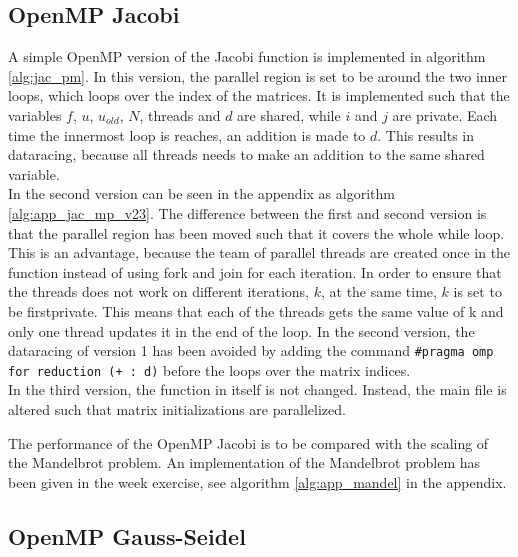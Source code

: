 



\subsection{OpenMP Jacobi}
A simple OpenMP version of the Jacobi function is implemented in algorithm \ref{alg:jac_pm}. In this version, the parallel region is set to be around the two inner loops, which loops over the index of the matrices. It is implemented such that the variables $f$, $u$, $u_{old}$, $N$, threads and $d$ are shared, while $i$ and $j$ are private. Each time the innermost loop is reaches, an addition is made to $d$. This results in dataracing, because all threads needs to make an addition to the same shared variable. \\ 
In the second version can be seen in the appendix as algorithm \ref{alg:app_jac_mp_v23}. The difference between the first and second version is that the parallel region has been moved such that it covers the whole while loop. This is an advantage, because the team of parallel threads are created once in the function instead of using fork and join for each iteration. In order to ensure that the threads does not work on different iterations, $k$, at the same time, $k$ is set to be firstprivate. This means that each of the threads gets the same value of k and only one thread updates it in the end of the loop. In the second version, the dataracing of version 1 has been avoided by adding the command \texttt{\#pragma omp for reduction (+ : d)} before the loops over the matrix indices. \\
In the third version, the function in itself is not changed. Instead, the main file is altered such that matrix initializations are parallelized. 







The performance of the OpenMP Jacobi is to be compared with the scaling of the Mandelbrot problem. An implementation of the Mandelbrot problem has been given in the week exercise, see algorithm  \ref{alg:app_mandel} in the appendix. \\

\subsection{OpenMP Gauss-Seidel}

